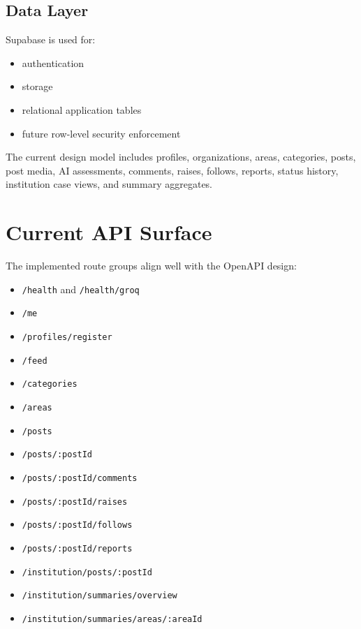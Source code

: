 \documentclass[11pt,a4paper]{article}
\begin{document}
\subsection{Data Layer}
Supabase is used for:
\begin{itemize}
  \item authentication
  \item storage
  \item relational application tables
  \item future row-level security enforcement
\end{itemize}

The current design model includes profiles, organizations, areas, categories, posts, post media, AI assessments, comments, raises, follows, reports, status history, institution case views, and summary aggregates.

\section{Current API Surface}
The implemented route groups align well with the OpenAPI design:
\begin{itemize}
  \item \texttt{/health} and \texttt{/health/groq}
  \item \texttt{/me}
  \item \texttt{/profiles/register}
  \item \texttt{/feed}
  \item \texttt{/categories}
  \item \texttt{/areas}
  \item \texttt{/posts}
  \item \texttt{/posts/:postId}
  \item \texttt{/posts/:postId/comments}
  \item \texttt{/posts/:postId/raises}
  \item \texttt{/posts/:postId/follows}
  \item \texttt{/posts/:postId/reports}
  \item \texttt{/institution/posts/:postId}
  \item \texttt{/institution/summaries/overview}
  \item \texttt{/institution/summaries/areas/:areaId}
\end{itemize}
\end{document}
